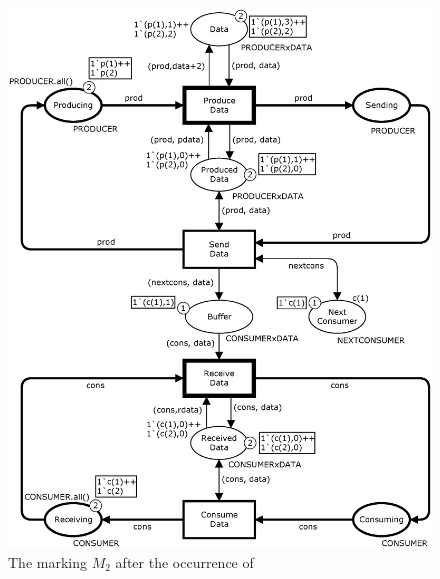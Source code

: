 \begin{figure}
\centering
\includegraphics[scale=0.35]{background/graphics/SystemM2.eps}
\caption{The marking $M_2$ after the occurrence of }
\label{fig:systemmoduleM2}
\end{figure}

